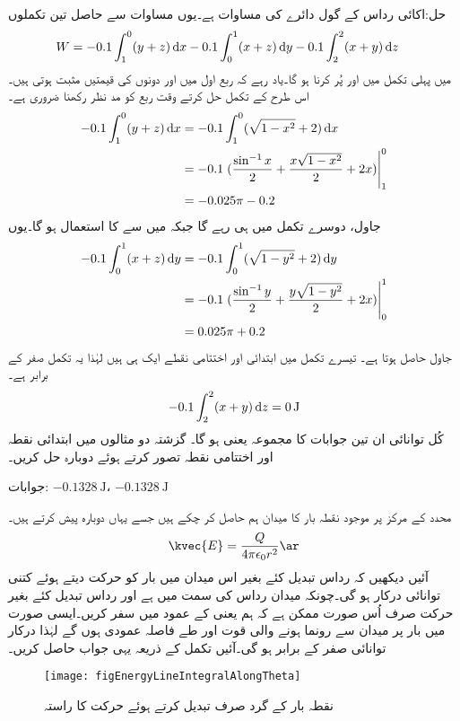 حل:اکائی رداس کے گول دائرے کی مساوات  ہے۔یوں مساوات  سے حاصل تین تکملوں
\begin{align*}
W&=-0.1 \int_{1}^{0} (y+z) \dif x -0.1 \int_{0}^{1}(x+z) \dif y-0.1 \int_{2}^{2} (x+y) \dif z
\end{align*}
میں پہلی تکمل میں  اور  پُر کرنا ہو گا۔یاد رہے کہ ربع اول میں  اور  دونوں کی قیمتیں مثبت ہوتی ہیں۔اس طرح کے تکمل حل کرتے وقت ربع کو مد نظر رکھنا ضروری ہے۔ 
\begin{align*}
-0.1 \int_{1}^{0} (y+z) \dif x&=-0.1\int_{1}^{0} (\sqrt{1-x^2}+2) \dif x\\
&=-0.1\left.(\frac{\sin^{-1} x}{2}+\frac{x \sqrt{1-x^2}}{2}+2x)\right|_1^0\\
&=-0.025 \pi-0.2
\end{align*}
جاول، دوسرے تکمل میں  ہی رہے گا جبکہ  میں سے  کا استعمال ہو گا۔یوں
\begin{align*}
-0.1 \int_{0}^{1}(x+z) \dif y&=-0.1\int_{0}^{1} (\sqrt{1-y^2}+2) \dif y\\
&=-0.1\left.(\frac{\sin^{-1} y}{2}+\frac{y \sqrt{1-y^2}}{2}+2x)\right|_0^1\\
&=0.025 \pi+0.2
\end{align*}
جاول حاصل ہوتا ہے۔ تیسرے تکمل میں ابتدائی اور اختتامی نقطے ایک ہی ہیں لہٰذا یہ تکمل صفر کے برابر ہے۔ 
\begin{align*}
-0.1 \int_{2}^{2} (x+y)  \dif z =\SI{0}{\joule}
\end{align*}
کُل توانائی ان تین جوابات کا مجموعہ یعنی  ہو گا۔
گزشتہ دو مثالوں میں ابتدائی نقطہ  اور اختتامی نقطہ  تصور کرتے ہوئے دوبارہ حل کریں۔

جوابات:  $\SI{-0.1328}{\joule}$، $\SI{-0.1328}{\joule}$


محدد کے مرکز پر موجود نقطہ بار  کا میدان ہم حاصل کر چکے ہیں جسے یہاں دوبارہ پیش کرتے ہیں۔
\begin{align}
\kvec{E}=\frac{Q}{4 \pi \epsilon_0 r^2} \ar
\end{align}
آئیں دیکھیں کہ رداس تبدیل کئے بغیر اس میدان میں بار  کو حرکت دیتے ہوئے کتنی توانائی درکار ہو گی۔چونکہ میدان رداس کی سمت میں ہے اور رداس تبدیل کئے بغیر حرکت صرف اُس صورت ممکن ہے کہ ہم  یعنی  کے عمود میں سفر کریں۔ایسی صورت میں بار پر میدان سے رونما ہونے والی قوت اور طے فاصلہ عمودی ہوں گے لہٰذا درکار توانائی صفر کے برابر ہو گی۔آئیں تکمل کے ذریعہ یہی جواب حاصل کریں۔
\begin{figure}
\centering
\texttt{[image: figEnergyLineIntegralAlongTheta]}
\caption{نقطہ بار کے گرد صرف  تبدیل کرتے ہوئے حرکت کا راستہ}
\label{شکل_توانائی_نقطہ_بار_کے_گرد_تھیٹا_تبدیل_کرتے_راستہ}
\end{figure}

